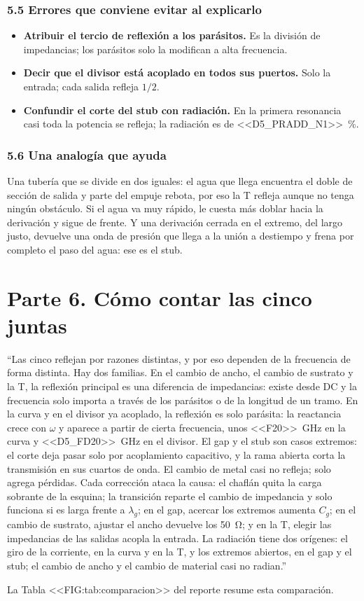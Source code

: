 \documentclass[11pt,letterpaper]{article}
\begin{document}
\section*{5.5 Errores que conviene evitar al explicarlo}
\begin{itemize}
\item \textbf{Atribuir el tercio de reflexión a los parásitos.} Es la división de impedancias; los parásitos solo la modifican a alta frecuencia.
\item \textbf{Decir que el divisor está acoplado en todos sus puertos.} Solo la entrada; cada salida refleja $1/2$.
\item \textbf{Confundir el corte del stub con radiación.} En la primera resonancia casi toda la potencia se refleja; la radiación es de \SI{<<D5_PRADD_N1>>}{\percent}.
\end{itemize}

\section*{5.6 Una analogía que ayuda}
Una tubería que se divide en dos iguales: el agua que llega encuentra el doble de sección de salida y parte del empuje rebota, por eso la T refleja aunque no tenga ningún obstáculo. Si el agua va muy rápido, le cuesta más doblar hacia la derivación y sigue de frente. Y una derivación cerrada en el extremo, del largo justo, devuelve una onda de presión que llega a la unión a destiempo y frena por completo el paso del agua: ese es el stub.

\newpage
\part*{Parte 6. Cómo contar las cinco juntas}
\begin{idea}
``Las cinco reflejan por razones distintas, y por eso dependen de la frecuencia de forma distinta. Hay dos familias. En el cambio de ancho, el cambio de sustrato y la T, la reflexión principal es una diferencia de impedancias: existe desde DC y la frecuencia solo importa a través de los parásitos o de la longitud de un tramo. En la curva y en el divisor ya acoplado, la reflexión es solo parásita: la reactancia crece con $\omega$ y aparece a partir de cierta frecuencia, unos \SI{<<F20>>}{GHz} en la curva y \SI{<<D5_FD20>>}{GHz} en el divisor. El gap y el stub son casos extremos: el corte deja pasar solo por acoplamiento capacitivo, y la rama abierta corta la transmisión en sus cuartos de onda. El cambio de metal casi no refleja; solo agrega pérdidas. Cada corrección ataca la causa: el chaflán quita la carga sobrante de la esquina; la transición reparte el cambio de impedancia y solo funciona si es larga frente a $\lambda_g$; en el gap, acercar los extremos aumenta $C_g$; en el cambio de sustrato, ajustar el ancho devuelve los \SI{50}{\ohm}; y en la T, elegir las impedancias de las salidas acopla la entrada. La radiación tiene dos orígenes: el giro de la corriente, en la curva y en la T, y los extremos abiertos, en el gap y el stub; el cambio de ancho y el cambio de material casi no radian.''
\end{idea}
La Tabla <<FIG:tab:comparacion>> del reporte resume esta comparación.
\end{document}
